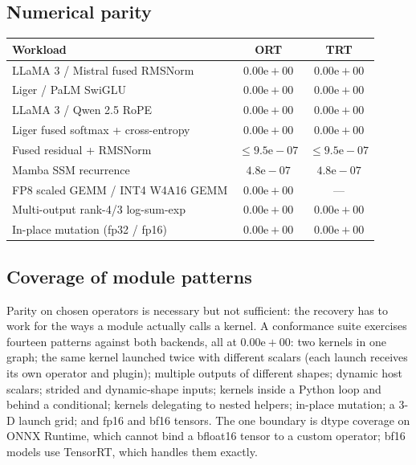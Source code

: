\documentclass[11pt,a4paper]{article}
\begin{document}
\subsection{Numerical parity}

\begin{center}
\small
\begin{tabular}{lcc}
\toprule
\textbf{Workload} & \textbf{ORT} & \textbf{TRT} \\ \midrule
LLaMA 3 / Mistral fused RMSNorm & $0.00\text{e}{+}00$ & $0.00\text{e}{+}00$ \\
Liger / PaLM SwiGLU & $0.00\text{e}{+}00$ & $0.00\text{e}{+}00$ \\
LLaMA 3 / Qwen 2.5 RoPE & $0.00\text{e}{+}00$ & $0.00\text{e}{+}00$ \\
Liger fused softmax + cross-entropy & $0.00\text{e}{+}00$ & $0.00\text{e}{+}00$ \\
Fused residual + RMSNorm & $\le 9.5\text{e}{-}07$ & $\le 9.5\text{e}{-}07$ \\
Mamba SSM recurrence & $4.8\text{e}{-}07$ & $4.8\text{e}{-}07$ \\
FP8 scaled GEMM / INT4 W4A16 GEMM & $0.00\text{e}{+}00$ & --- \\
Multi-output rank-4/3 log-sum-exp & $0.00\text{e}{+}00$ & $0.00\text{e}{+}00$ \\
In-place mutation (fp32 / fp16) & $0.00\text{e}{+}00$ & $0.00\text{e}{+}00$ \\
\bottomrule
\end{tabular}
\label{tab:parity}
\end{center}

\subsection{Coverage of module patterns}

Parity on chosen operators is necessary but not sufficient: the recovery has to
work for the ways a module actually calls a kernel. A conformance suite exercises
fourteen patterns against both backends, all at $0.00\text{e}{+}00$: two kernels
in one graph; the same kernel launched twice with different scalars (each launch
receives its own operator and plugin); multiple outputs of different shapes;
dynamic host scalars; strided and dynamic-shape inputs; kernels inside a Python
loop and behind a conditional; kernels delegating to nested helpers; in-place
mutation; a 3-D launch grid; and fp16 and bf16 tensors. The one boundary is dtype
coverage on ONNX Runtime, which cannot bind a bfloat16 tensor to a custom
operator; bf16 models use TensorRT, which handles them exactly.
\end{document}
